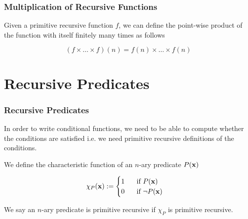 \documentclass{beamer}
\begin{document}
\begin{frame}
	\frametitle{Multiplication of Recursive Functions}

	Given a primitive recursive function $f$, we can define the point-wise product of the function with itself finitely many times as follows 

	$$(f \times \dots \times f)(n) = f(n) \times \dots \times f(n)$$
	


	\vspace{6cm}

\end{frame}

\section{Recursive Predicates}

\begin{frame}
	\frametitle{Recursive Predicates}	

	In order to write conditional functions, we need to be able to compute whether the conditions are satisfied i.e. we need primitive recursive definitions of the conditions. 

	\vspace{0.5cm}

	We define the characteristic function of an $n$-ary predicate $P({\bf x})$

	\vspace{0.5cm}

	$$\chi_{P}({\bf x}):= \begin{cases}
		1 \hspace{0.5cm} \text{ if } P({\bf x})\\
		0 \hspace{0.5cm} \text{ if } \lnot P({\bf x})
	\end{cases} $$

	We say an $n$-ary predicate is primitive recursive if $\chi_{P}$ is primitive recursive. 

	\vspace{5cm}

\end{frame}
\end{document}
